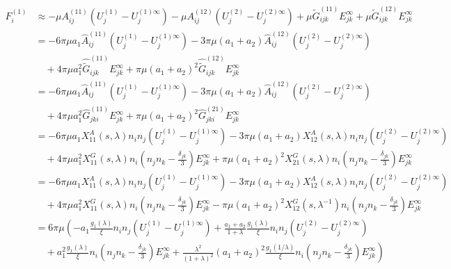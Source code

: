 \documentclass[12pt]{article}
\begin{document}
\begin{align*}
F^{(1)}_i
&\approx 
- \mu A^{(11)}_{ij}
(U_{j}^{(1)}-U_{j}^{(1)\infty})
- \mu A^{(12)}_{ij}
(U_{j}^{(2)}-U_{j}^{(2)\infty})
+ \mu \tilde{G}^{(11)}_{ijk} E^{\infty}_{jk}
+ \mu \tilde{G}^{(12)}_{ijk} E^{\infty}_{jk} \\
&=
- 6 \pi\mu a_{1} \hat{A}^{(11)}_{ij}(U_{j}^{(1)}-U_{j}^{(1)\infty})
- 3 \pi\mu (a_{1}+a_{2})\hat{A}^{(12)}_{ij} (U_{j}^{(2)}-U_{j}^{(2)\infty})\\
&\quad
+ 4 \pi\mu a_{1}^2 \hat{\tilde{G}}^{(11)}_{ijk} E^{\infty}_{jk}
+ \pi\mu (a_{1}+a_{2})^2 \hat{\tilde{G}}^{(12)}_{ijk} E^{\infty}_{jk} \\
&=
- 6 \pi\mu a_{1} \hat{A}^{(11)}_{ij}
(U_{j}^{(1)}-U_{j}^{(1)\infty})
- 3 \pi\mu (a_{1}+a_{2})\hat{A}^{(12)}_{ij}
(U_{j}^{(2)}-U_{j}^{(2)\infty}) \\
&\quad
+ 4 \pi\mu a_{1}^2 \hat{G}^{(11)}_{jki} E^{\infty}_{jk}
+  \pi\mu (a_{1}+a_{2})^2 \hat{G}^{(21)}_{jki} E^{\infty}_{jk} \\
&=
- 6 \pi\mu a_{1} X_{11}^{A}(s,\lambda) n_i n_j
(U_{j}^{(1)}-U_{j}^{(1)\infty})
- 3 \pi\mu (a_{1}+a_{2}) X_{12}^{A}(s,\lambda) n_i n_j
(U_{j}^{(2)}-U_{j}^{(2)\infty}) \\
&\quad
+ 4 \pi\mu a_{1}^2 X_{11}^{G}(s,\lambda) 
n_i\left(n_j n_k - \frac{\delta_{jk}}{3}  \right) E^{\infty}_{jk}
+  \pi\mu (a_{1}+a_{2})^2
X_{21}^{G}(s,\lambda) 
n_i\left(n_j n_k - 
\frac{\delta_{jk}}{3} \right) E^{\infty}_{jk} \\
&=
- 6 \pi\mu a_{1} X_{11}^{A}(s,\lambda) n_i n_j
(U_{j}^{(1)}-U_{j}^{(1)\infty})
- 3 \pi\mu (a_{1}+a_{2}) X_{12}^{A}(s,\lambda) n_i n_j
(U_{j}^{(2)}-U_{j}^{(2)\infty}) \\
&\quad
+ 4 \pi\mu a_{1}^2 X_{11}^{G} (s,\lambda)
n_i\left(n_j n_k - \frac{\delta_{jk}}{3}  \right) E^{\infty}_{jk}
-  \pi\mu (a_{1}+a_{2})^2 X_{12}^{G}(s,\lambda^{-1})
n_i\left(n_j n_k - 
\frac{\delta_{jk}}{3} \right) E^{\infty}_{jk} \\
&=
6 \pi\mu
\left(
-  a_{1} \frac{g_1(\lambda)}{\xi} n_i n_j
(U_{j}^{(1)}-U_{j}^{(1)\infty})
+ \frac{a_{1}+a_{2}}{1+\lambda} \frac{g_1(\lambda)}{\xi} n_i n_j
(U_{j}^{(2)}-U_{j}^{(2)\infty})\right.
\\
&\quad + 
\left.
 a_{1}^2 \frac{g_1(\lambda)}{\xi} 
n_i\left(n_j n_k - \frac{\delta_{jk}}{3} \right) E^{\infty}_{jk}
+  
\frac{  \lambda^2}{(1+\lambda)^2} 
 (a_{1}+ a_{2})^2
\frac{g_1(1/\lambda)}{\xi} n_i\left(n_j n_k 
- \frac{\delta_{jk}}{3} \right)E^{\infty}_{jk} 
\right)
\end{align*}
\end{document}
